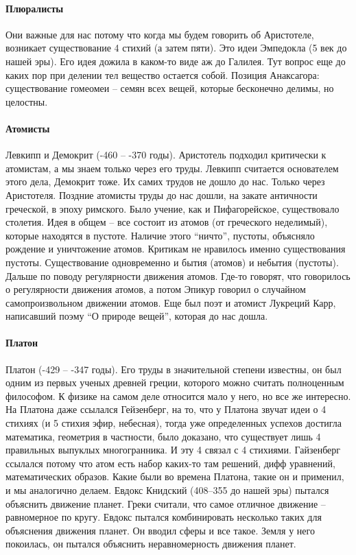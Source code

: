 \documentclass[a4paper, 12pt]{article}
\begin{document}
\paragraph{Плюралисты}
Они важные для нас потому что когда мы будем говорить об Аристотеле, 
возникает существование 4 стихий (а затем пяти). Это идеи Эмпедокла (5 
век до нашей эры). Его идея дожила в каком-то виде аж до Галилея. Тут 
вопрос еще до каких пор при делении тел вещество остается собой. Позиция 
Анаксагора: существование гомеомеи -- семян всех вещей, которые 
бесконечно делимы, но целостны.

\paragraph{Атомисты}
Левкипп и Демокрит (-460 -- -370 годы). Аристотель подходил критически 
к атомистам, а мы знаем только через его труды. Левкипп считается 
основателем этого дела, Демокрит тоже. Их самих трудов не дошло до нас. 
Только через Аристотеля. Поздние атомисты труды до нас дошли, на закате 
античности греческой, в эпоху римского. Было учение, как 
и Пифагорейское, существовало столетия. Идея в общем -- все состоит из 
атомов (от греческого неделимый), которые находятся в пустоте. Наличие 
этого ``ничто'', пустоты, объясняло рождение и уничтожение атомов. 
Критикам не нравилось именно существования пустоты. Существование 
одновременно и бытия (атомов) и небытия (пустоты). Дальше по поводу 
регулярности движения атомов. Где-то говорят, что говорилось 
о регулярности движения атомов, а потом Эпикур говорил о случайном 
самопроизвольном движении атомов. Еще был поэт и атомист Лукреций Карр, 
написавший поэму ``О природе вещей'', которая до нас дошла.

\paragraph{Платон}
Платон (-429 -- -347 годы). Его труды в значительной степени известны, 
он был одним из первых ученых древней греции, которого можно считать 
полноценным философом. К физике на самом деле относится мало у него, но 
все же интересно. На Платона даже ссылался Гейзенберг, на то, что 
у Платона звучат идеи о 4 стихиях (и 5 стихия эфир, небесная), тогда уже 
определенных успехов достигла математика, геометрия в частности, было 
доказано, что существует лишь 4 правильных выпуклых многогранника. И эту 
4 связал с 4 стихиями. Гайзенберг ссылался потому что атом есть набор 
каких-то там решений, дифф уравнений, математических образов. Какие были 
во времена Платона, такие он и применил, и мы аналогично делаем. Евдокс 
Книдский (408--355 до нашей эры) пытался объяснить движение планет. 
Греки считали, что самое отличное движение -- равномерное по кругу. 
Евдокс пытался комбинировать несколько таких для объяснения движения 
планет. Он вводил сферы и все такое. Земля у него покоилась, он пытался 
объяснить неравномерность движения планет.
\end{document}
